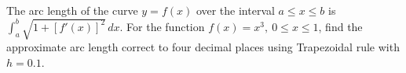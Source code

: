 \documentclass{article}
\begin{document}
	The arc length of the curve $y=f(x)$ over the interval $a\leq x\leq b$ is
	$\displaystyle\int_a^b\sqrt{1+[f'(x)]^2}\,dx$. For the function
	$f(x)=x^3,\ 0\leq x\leq 1$, find the approximate arc length correct to four
	decimal places using Trapezoidal rule with $h=0.1$.
\end{document}
